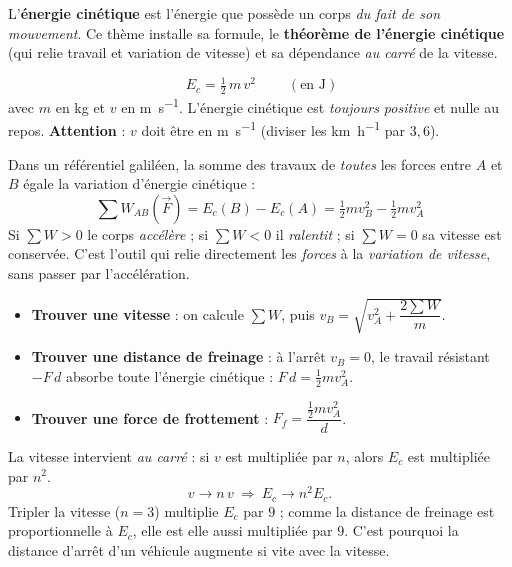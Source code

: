 \documentclass[11pt,a4paper]{article}
\newcommand{\vv}[1]{\vec{#1}}\newcommand{\ds}{\displaystyle}
\begin{document}

L'\textbf{énergie cinétique} est l'énergie que possède un corps \emph{du fait de son mouvement}. Ce
thème installe sa formule, le \textbf{théorème de l'énergie cinétique} (qui relie travail et
variation de vitesse) et sa dépendance \emph{au carré} de la vitesse.

\begin{cle}
\[
\boxed{\;E_c=\tfrac12\,m\,v^2\;}\qquad(\text{en }\si{\joule})
\]
avec $m$ en \si{\kilogram} et $v$ en \si{\metre\per\second}. L'énergie cinétique est \emph{toujours
positive} et nulle au repos. \textbf{Attention} : $v$ doit être en \si{\metre\per\second} (diviser les
\si{\kilo\metre\per\hour} par $3,6$).
\end{cle}

\begin{cle}
Dans un référentiel galiléen, la somme des travaux de \emph{toutes} les forces entre $A$ et $B$ égale
la variation d'énergie cinétique :
\[
\boxed{\;\sum W_{AB}(\vv F)=E_c(B)-E_c(A)=\tfrac12 m v_B^2-\tfrac12 m v_A^2\;}
\]
Si $\sum W>0$ le corps \emph{accélère} ; si $\sum W<0$ il \emph{ralentit} ; si $\sum W=0$ sa vitesse
est conservée. C'est l'outil qui relie directement les \emph{forces} à la \emph{variation de vitesse},
sans passer par l'accélération.
\end{cle}

\begin{methode}
\begin{itemize}[leftmargin=1.5em,topsep=1pt,itemsep=1pt]
  \item \textbf{Trouver une vitesse} : on calcule $\sum W$, puis $v_B=\sqrt{v_A^2+\dfrac{2\sum W}{m}}$.
  \item \textbf{Trouver une distance de freinage} : à l'arrêt $v_B=0$, le travail résistant
        $-F\,d$ absorbe toute l'énergie cinétique : $F\,d=\tfrac12 m v_A^2$.
  \item \textbf{Trouver une force de frottement} : $F_f=\dfrac{\tfrac12 m v_A^2}{d}$.
\end{itemize}
\end{methode}

\begin{piege}[la dépendance en $v^2$]
La vitesse intervient \emph{au carré} : si $v$ est multipliée par $n$, alors $E_c$ est multipliée par
$n^2$.
\[
v\to n\,v\ \Longrightarrow\ E_c\to n^2 E_c .
\]
Tripler la vitesse ($n=3$) multiplie $E_c$ par $9$ ; comme la distance de freinage est proportionnelle
à $E_c$, elle est elle aussi multipliée par $9$. C'est pourquoi la distance d'arrêt d'un véhicule
augmente si vite avec la vitesse.
\end{piege}
\end{document}
